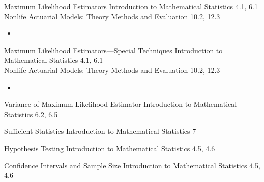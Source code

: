 \begin{CHPT_SUMM_AUTO_NUMB}[label = {L.-29}]{Maximum Likelihood Estimators}
Introduction to Mathematical Statistics 4.1, 6.1\\
Nonlife Actuarial Models: Theory Methods and Evaluation 10.2, 12.3

\tcbline

	\begin{itemize}[leftmargin = *]
		\item	
	\end{itemize}
\end{CHPT_SUMM_AUTO_NUMB}

\begin{CHPT_SUMM_AUTO_NUMB}[label = {L.-30}]{Maximum Likelihood Estimators---Special Techniques}
Introduction to Mathematical Statistics 4.1, 6.1	\\
Nonlife Actuarial Models: Theory Methods and Evaluation 10.2, 12.3

\tcbline

	\begin{itemize}
		\item	
	\end{itemize}
\end{CHPT_SUMM_AUTO_NUMB}

\begin{CHPT_SUMM_AUTO_NUMB}[label = {L.-31}]{Variance of Maximum Likelihood Estimator}
Introduction to Mathematical Statistics 6.2, 6.5

\tcbline


\end{CHPT_SUMM_AUTO_NUMB}

\begin{CHPT_SUMM_AUTO_NUMB}[label = {L.-32}]{Sufficient Statistics}
Introduction to Mathematical Statistics 7

\tcbline


\end{CHPT_SUMM_AUTO_NUMB}

\begin{CHPT_SUMM_AUTO_NUMB}[label = {L.-33}]{Hypothesis Testing}
Introduction to Mathematical Statistics 4.5, 4.6

\tcbline


\end{CHPT_SUMM_AUTO_NUMB}

\begin{CHPT_SUMM_AUTO_NUMB}[label = {L.-34}]{Confidence Intervals and Sample Size}
Introduction to Mathematical Statistics 4.5, 4.6

\tcbline


\end{CHPT_SUMM_AUTO_NUMB}

